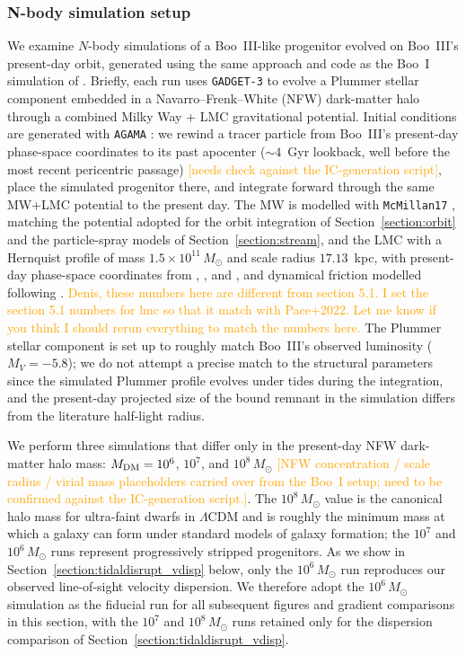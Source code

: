\documentclass[twocolumn, apj, numberedappendix, appendixfloats]{openjournal_dhayaa}
\newcommand{\fixme}{\textcolor{orange}}
\begin{document}
\subsubsection{N-body simulation setup}
We examine $N$-body simulations of a Boo~III-like progenitor evolved on Boo~III's present-day orbit, generated using the same approach and code as the Boo~I simulation of \citet{Sandford2025}. Briefly, each run uses \texttt{GADGET-3} \citep[an improved version of the \texttt{GADGET-2} code of][]{Springel2005} to evolve a Plummer stellar component embedded in a Navarro--Frenk--White (NFW) dark-matter halo through a combined Milky Way + LMC gravitational potential. Initial conditions are generated with \texttt{AGAMA} \citep{Vasiliev2019}: we rewind a tracer particle from Boo~III's present-day phase-space coordinates to its past apocenter ($\sim 4$~Gyr lookback, well before the most recent pericentric passage) \fixme{[needs check against the IC-generation script]}, place the simulated progenitor there, and integrate forward through the same MW+LMC potential to the present day. The MW is modelled with \texttt{McMillan17} \citep{McMillan2017}, matching the potential adopted for the orbit integration of Section~\ref{section:orbit} and the particle-spray models of Section~\ref{section:stream}, and the LMC with a Hernquist profile of mass $1.5\times10^{11}\,M_\odot$ and scale radius $17.13$~kpc, with present-day phase-space coordinates from \citet{Kallivayalil2013}, \citet{Pietrzynski2019}, and \citet{vandermarel2002}, and dynamical friction modelled following \citet{Jethwa2016}. \fixme{Denis, these numbers here are different from section 5.1. I set the section 5.1 numbers for lmc so that it match with 
Pace+2022. Let me know if you think I should rerun everything to match the numbers here.} The Plummer stellar component is set up to roughly match Boo~III's observed luminosity ($M_V = -5.8$); we do not attempt a precise match to the structural parameters since the simulated Plummer profile evolves under tides during the integration, and the present-day projected size of the bound remnant in the simulation differs from the literature half-light radius.

We perform three simulations that differ only in the present-day NFW dark-matter halo mass: $M_{\rm DM} = 10^6$, $10^7$, and $10^8\,M_\odot$ \fixme{[NFW concentration / scale radius / virial mass placeholders carried over from the Boo~I setup; need to be confirmed against the IC-generation script.]}. The $10^8\,M_\odot$ value is the canonical halo mass for ultra-faint dwarfs in $\Lambda$CDM \citep[e.g.,][]{Simon2019} and is roughly the minimum mass at which a galaxy can form under standard models of galaxy formation; the $10^7$ and $10^6\,M_\odot$ runs represent progressively stripped progenitors. As we show in Section~\ref{section:tidaldisrupt_vdisp} below, only the $10^6\,M_\odot$ run reproduces our observed line-of-sight velocity dispersion. We therefore adopt the $10^6\,M_\odot$ simulation as the fiducial run for all subsequent figures and gradient comparisons in this section, with the $10^7$ and $10^8\,M_\odot$ runs retained only for the dispersion comparison of Section~\ref{section:tidaldisrupt_vdisp}.
\end{document}
